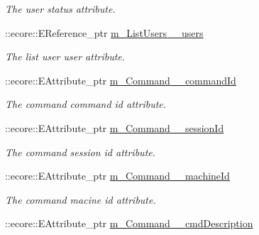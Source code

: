 \begin{DoxyCompactItemize}
\begin{DoxyCompactList}\small\item\em The user status attribute. \item\end{DoxyCompactList}\item 
\hypertarget{classUMS__Data_1_1UMS__DataPackage_a9e41dcec92d5cfebe31191846aa349d5}{
::ecore::EReference\_\-ptr \hyperlink{classUMS__Data_1_1UMS__DataPackage_a9e41dcec92d5cfebe31191846aa349d5}{m\_\-ListUsers\_\-\_\-users}}
\label{classUMS__Data_1_1UMS__DataPackage_a9e41dcec92d5cfebe31191846aa349d5}

\begin{DoxyCompactList}\small\item\em The list user user attribute. \item\end{DoxyCompactList}\item 
\hypertarget{classUMS__Data_1_1UMS__DataPackage_a451a5d5b044989cbeb32752209d9db12}{
::ecore::EAttribute\_\-ptr \hyperlink{classUMS__Data_1_1UMS__DataPackage_a451a5d5b044989cbeb32752209d9db12}{m\_\-Command\_\-\_\-commandId}}
\label{classUMS__Data_1_1UMS__DataPackage_a451a5d5b044989cbeb32752209d9db12}

\begin{DoxyCompactList}\small\item\em The command command id attribute. \item\end{DoxyCompactList}\item 
\hypertarget{classUMS__Data_1_1UMS__DataPackage_a5c3b41290716aeca366e4005bced9a26}{
::ecore::EAttribute\_\-ptr \hyperlink{classUMS__Data_1_1UMS__DataPackage_a5c3b41290716aeca366e4005bced9a26}{m\_\-Command\_\-\_\-sessionId}}
\label{classUMS__Data_1_1UMS__DataPackage_a5c3b41290716aeca366e4005bced9a26}

\begin{DoxyCompactList}\small\item\em The command session id attribute. \item\end{DoxyCompactList}\item 
\hypertarget{classUMS__Data_1_1UMS__DataPackage_aa4c0cd261f0052f22ea73f15a53cfbc7}{
::ecore::EAttribute\_\-ptr \hyperlink{classUMS__Data_1_1UMS__DataPackage_aa4c0cd261f0052f22ea73f15a53cfbc7}{m\_\-Command\_\-\_\-machineId}}
\label{classUMS__Data_1_1UMS__DataPackage_aa4c0cd261f0052f22ea73f15a53cfbc7}

\begin{DoxyCompactList}\small\item\em The command macine id attribute. \item\end{DoxyCompactList}\item 
\hypertarget{classUMS__Data_1_1UMS__DataPackage_ac5e02fc7ea6845ccc52ab82124738c37}{
::ecore::EAttribute\_\-ptr \hyperlink{classUMS__Data_1_1UMS__DataPackage_ac5e02fc7ea6845ccc52ab82124738c37}{m\_\-Command\_\-\_\-cmdDescription}}
\label{classUMS__Data_1_1UMS__DataPackage_ac5e02fc7ea6845ccc52ab82124738c37}


\end{DoxyCompactItemize}
